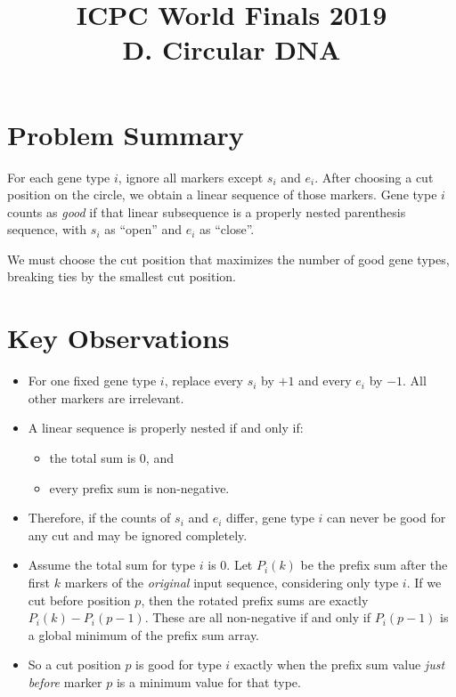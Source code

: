 \documentclass[11pt]{article}
\title{ICPC World Finals 2019\\D. Circular DNA}
\author{}
\date{}
\begin{document}
\maketitle

\section*{Problem Summary}

For each gene type $i$, ignore all markers except $s_i$ and $e_i$. After choosing a cut position on the circle, we obtain a linear sequence of those markers. Gene type $i$ counts as \emph{good} if that linear subsequence is a properly nested parenthesis sequence, with $s_i$ as ``open'' and $e_i$ as ``close''.

We must choose the cut position that maximizes the number of good gene types, breaking ties by the smallest cut position.

\section*{Key Observations}

\begin{itemize}[leftmargin=*]
    \item For one fixed gene type $i$, replace every $s_i$ by $+1$ and every $e_i$ by $-1$. All other markers are irrelevant.
    \item A linear sequence is properly nested if and only if:
    \begin{itemize}[leftmargin=*]
        \item the total sum is $0$, and
        \item every prefix sum is non-negative.
    \end{itemize}
    \item Therefore, if the counts of $s_i$ and $e_i$ differ, gene type $i$ can never be good for any cut and may be ignored completely.
    \item Assume the total sum for type $i$ is $0$. Let $P_i(k)$ be the prefix sum after the first $k$ markers of the \emph{original} input sequence, considering only type $i$. If we cut before position $p$, then the rotated prefix sums are exactly $P_i(k) - P_i(p-1)$. These are all non-negative if and only if $P_i(p-1)$ is a global minimum of the prefix sum array.
    \item So a cut position $p$ is good for type $i$ exactly when the prefix sum value \emph{just before} marker $p$ is a minimum value for that type.
\end{itemize}
\end{document}
